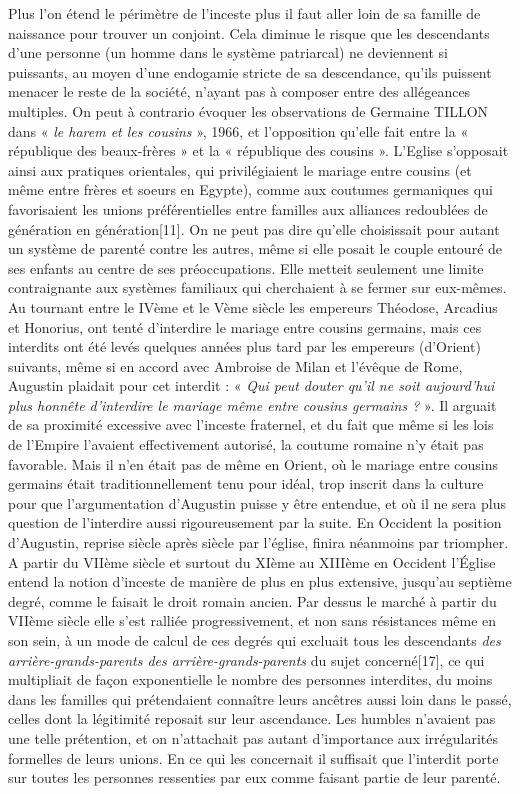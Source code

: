  Plus l'on étend le périmètre de l'inceste plus il faut aller loin de sa famille de naissance pour trouver un conjoint. Cela diminue le risque que les descendants d'une personne (un homme dans le système patriarcal) ne deviennent si puissants, au moyen d'une endogamie stricte de sa descendance, qu'ils puissent menacer le reste de la société, n'ayant pas à composer entre des allégeances multiples. On peut à contrario évoquer les observations de Germaine TILLON dans « \emph{le harem et les cousins} », 1966, et l'opposition qu'elle fait entre la « république des beaux-frères » et la « république des cousins ». L'Eglise s'opposait ainsi aux pratiques orientales, qui privilégiaient le mariage entre cousins (et même entre frères et soeurs en Egypte), comme aux coutumes germaniques qui favorisaient les unions préférentielles entre familles aux alliances redoublées de génération en génération[11]. On ne peut pas dire qu'elle choisissait pour autant un système de parenté contre les autres, même si elle posait le couple entouré de ses enfants au centre de ses préoccupations. Elle metteit seulement une limite contraignante aux systèmes familiaux qui cherchaient à se fermer sur eux-mêmes.
 Au tournant entre le IVème et le Vème siècle les empereurs Théodose, Arcadius et Honorius, ont tenté d'interdire le mariage entre cousins germains, mais ces interdits ont été levés quelques années plus tard par les empereurs (d'Orient) suivants, même si en accord avec Ambroise de Milan et l'évêque de Rome, Augustin plaidait pour cet interdit : « \emph{Qui peut douter qu'il ne soit aujourd'hui plus honnête d'interdire le mariage même entre cousins germains ?} ». Il arguait de sa proximité excessive avec l'inceste fraternel, et du fait que même si les lois de l'Empire l'avaient effectivement autorisé, la coutume romaine n'y était pas favorable. Mais il n'en était pas de même en Orient, où le mariage entre cousins germains était traditionnellement tenu pour idéal, trop inscrit dans la culture pour que l'argumentation d'Augustin puisse y être entendue, et où il ne sera plus question de l'interdire aussi rigoureusement par la suite. En Occident la position d'Augustin, reprise siècle après siècle par l'église, finira néanmoins par triompher.
 A partir du VIIème siècle et surtout du XIème au XIIIème en Occident l'Église entend la notion d'inceste de manière de plus en plus extensive, jusqu'au septième degré, comme le faisait le droit romain ancien. Par dessus le marché à partir du VIIème siècle elle s'est ralliée progressivement, et non sans résistances même en son sein, à un mode de calcul de ces degrés qui excluait tous les descendants \emph{des arrière-grands-parents des arrière-grands-parents} du sujet concerné[17], ce qui multipliait de façon exponentielle le nombre des personnes interdites, du moins dans les familles qui prétendaient connaître leurs ancêtres aussi loin dans le passé, celles dont la légitimité reposait sur leur ascendance. Les humbles n'avaient pas une telle prétention, et on n'attachait pas autant d'importance aux irrégularités formelles de leurs unions. En ce qui les concernait il suffisait que l'interdit porte sur toutes les personnes ressenties par eux comme faisant partie de leur parenté. 
